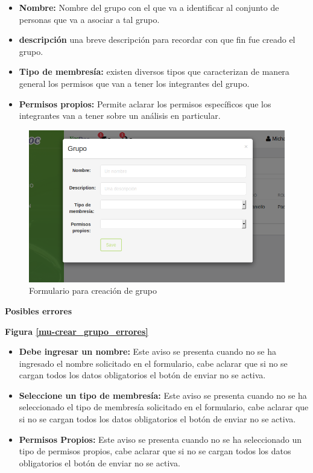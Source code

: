 \documentclass[a4paper,12pt]{article}
\begin{document}
\begin{itemize}
	\item \textbf{Nombre:} Nombre del grupo con el que va a identificar al conjunto de personas que va a asociar a tal grupo.
	\item  \textbf{descripción } una breve descripción para recordar con que fin fue  creado el grupo.
	\item \textbf{Tipo de membresía: } existen diversos tipos que caracterizan de manera general los permisos que van a tener los integrantes del grupo.
	\item \textbf{Permisos propios:} Permite aclarar los permisos específicos que los integrantes van a tener sobre un análisis en particular.
\end{itemize}
    \begin{figure}
    	\centering
    	\includegraphics[width=.8\textwidth]{img/manual_de_usuario/crear_grupo}
    	\caption{Formulario para creación de grupo}
    	\label{mu-crear_grupo}
    \end{figure}



\textbf{Posibles errores}

\textbf{Figura \ref{mu-crear_grupo_errores}}
\begin{itemize}
	\item \textbf{Debe ingresar un nombre:} Este aviso se presenta cuando no se ha ingresado el nombre solicitado en el formulario, cabe aclarar que si no se cargan todos los datos obligatorios el botón de enviar no se activa.
	\item \textbf{Seleccione un tipo de membresía: } Este aviso se presenta cuando no se ha seleccionado el tipo de membresía solicitado en el formulario, cabe aclarar que si no se cargan todos los datos obligatorios el botón de enviar no se activa.
	\item \textbf{Permisos Propios:} Este aviso se presenta cuando no se ha seleccionado un tipo de  permisos propios, cabe aclarar que si no se cargan todos los datos obligatorios el botón de enviar no se activa.
\end{itemize}
\end{document}
